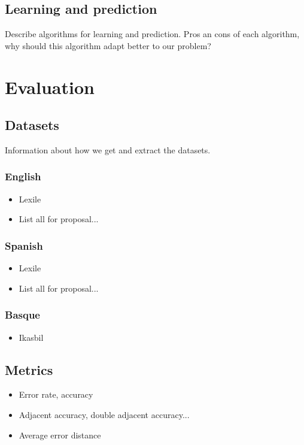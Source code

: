 \documentclass[12pt]{article}
\begin{document}
\subsection{Learning and prediction}
Describe algorithms for learning and prediction. Pros an cons of each algorithm, why should this algorithm adapt better to our problem?

\section{Evaluation}

\subsection{Datasets}
Information about how we get and extract the datasets.
\subsubsection{English}
\begin{itemize}
\item Lexile
\item List all for proposal...
\end{itemize}
\subsubsection{Spanish}
\begin{itemize}
\item Lexile
\item List all for proposal...
\end{itemize}
\subsubsection{Basque}
\begin{itemize}
\item Ikasbil
\end{itemize}

\subsection{Metrics}

\begin{itemize}
\item Error rate, accuracy
\item Adjacent accuracy, double adjacent accuracy...
\item Average error distance
\end{itemize}
\end{document}
